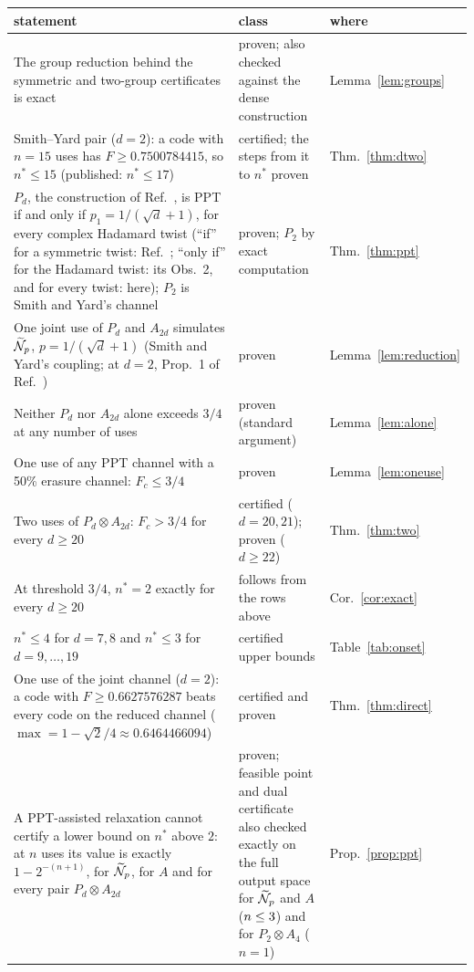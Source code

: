 \begin{tabular}{@{}p{}p{}l@{}}
\toprule
statement & class & where \\
\midrule
The group reduction behind the symmetric and two-group certificates is exact & proven; also checked against the dense construction & Lemma~\ref{lem:groups} \\
Smith--Yard pair ($d=2$): a code with $n=15$ uses has $F\ge0.7500784415$, so $n^*\le 15$ (published: $n^*\le 17$) & certified; the steps from it to $n^*$ proven & Thm.~\ref{thm:dtwo} \\
$P_d$, the construction of Ref.~\cite{horodecki2008low}, is PPT if and only if $p_1=1/(\sqrt d+1)$, for every complex Hadamard twist (``if'' for a symmetric twist: Ref.~\cite{horodecki2008low}; ``only if'' for the Hadamard twist: its Obs.~2, and for every twist: here); $P_2$ is Smith and Yard's channel & proven; $P_2$ by exact computation & Thm.~\ref{thm:ppt} \\
One joint use of $P_d$ and $A_{2d}$ simulates $\widetilde{\mathcal N}_p$, $p=1/(\sqrt d+1)$ (Smith and Yard's coupling; at $d=2$, Prop.~1 of Ref.~\cite{parentin2026onset}) & proven & Lemma~\ref{lem:reduction} \\
Neither $P_d$ nor $A_{2d}$ alone exceeds $3/4$ at any number of uses & proven (standard argument) & Lemma~\ref{lem:alone} \\
One use of any PPT channel with a 50\% erasure channel: $F_c\le 3/4$ & proven & Lemma~\ref{lem:oneuse} \\
Two uses of $P_d\otimes A_{2d}$: $F_c>3/4$ for every $d\ge 20$ & certified ($d=20,21$); proven ($d\ge 22$) & Thm.~\ref{thm:two} \\
At threshold $3/4$, $n^*=2$ exactly for every $d\ge 20$ & follows from the rows above & Cor.~\ref{cor:exact} \\
$n^*\le 4$ for $d=7,8$ and $n^*\le 3$ for $d=9,\dots,19$ & certified upper bounds & Table~\ref{tab:onset} \\
One use of the joint channel ($d=2$): a code with $F\ge 0.6627576287$ beats every code on the reduced channel ($\max=1-\sqrt2/4\approx0.6464466094$) & certified and proven & Thm.~\ref{thm:direct} \\
A PPT-assisted relaxation cannot certify a lower bound on $n^*$ above $2$: at $n$ uses its value is exactly $1-2^{-(n+1)}$, for $\widetilde{\mathcal N}_p$, for $A$ and for every pair $P_d\otimes A_{2d}$ & proven; feasible point and dual certificate also checked exactly on the full output space for $\widetilde{\mathcal N}_p$ and $A$ ($n\le3$) and for $P_2\otimes A_4$ ($n=1$) & Prop.~\ref{prop:ppt} \\
\bottomrule
\end{tabular}
